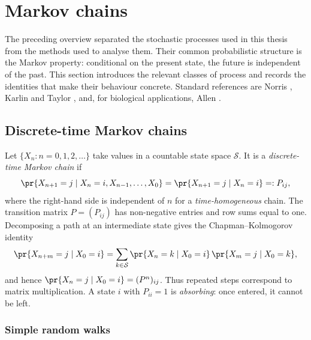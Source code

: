 \providecommand{\mextref}[2]{%
  \ifcsname r@#1\endcsname\cref{#1}\else#2\fi}

\section{Markov chains}
\label{m:sec:chains}

The preceding overview separated the stochastic processes used in this thesis
from the methods used to analyse them. Their common probabilistic structure is
the Markov property: conditional on the present state, the future is independent
of the past. This section introduces the relevant classes of process and records
the identities that make their behaviour concrete. Standard references are
Norris \cite{Norris1997}, Karlin and Taylor \cite{KarlinTaylor1975}, and, for
biological applications, Allen \cite{Allen2010}.

\subsection{Discrete-time Markov chains}
\label{m:sec:dtmc}

Let $\{X_n:n=0,1,2,\ldots\}$ take values in a countable state space
$\mathcal S$. It is a \emph{discrete-time Markov chain} if
\begin{equation}
\label{m:eq:dtmarkov}
\pr{X_{n+1}=j\mid X_n=i,X_{n-1},\ldots,X_0}
=\pr{X_{n+1}=j\mid X_n=i}=:P_{ij},
\end{equation}
where the right-hand side is independent of $n$ for a \emph{time-homogeneous}
chain. The transition matrix $P=(P_{ij})$ has non-negative entries and row sums
equal to one. Decomposing a path at an intermediate state gives the
Chapman--Kolmogorov identity
\begin{equation}
\label{m:eq:chapmankolmogorov}
\pr{X_{n+m}=j\mid X_0=i}
=\sum_{k\in\mathcal S}
  \pr{X_n=k\mid X_0=i}\,
  \pr{X_m=j\mid X_0=k},
\end{equation}
and hence $\pr{X_n=j\mid X_0=i}=(P^n)_{ij}$. Thus repeated steps correspond
to matrix multiplication. A state $i$ with $P_{ii}=1$ is \emph{absorbing}:
once entered, it cannot be left.

\subsubsection{Simple random walks}
\label{m:sec:randomwalk}

